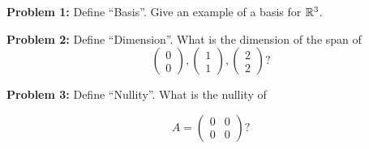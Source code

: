 \documentclass[a4paper,12pt]{article}
\begin{document}
{\Large{\bf Problem 1:}} Define ``Basis''. Give an example of a basis for $\mathbb{R}^3$.

{\Large{\bf Problem 2:}} Define ``Dimension''. What is the dimension of the span of\[\left( \begin{array}{ccc}0  \\ 0  \end{array} \right), \left( \begin{array}{ccc} 1 \\ 1  \end{array} \right), \left( \begin{array}{ccc}2 \\ 2 \end{array} \right)?\]

{\Large{\bf Problem 3:}} Define ``Nullity''. What is the nullity of 

\[A = \left( \begin{array}{ccc}0 & 0  \\ 0 & 0  \end{array} \right)?\]
\end{document}
